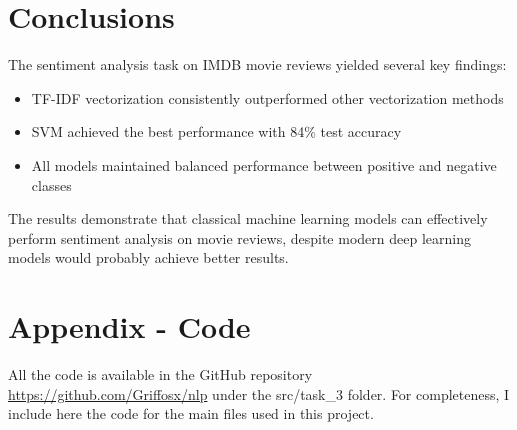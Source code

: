\documentclass[12pt]{article}
\begin{document}
\section{Conclusions}
The sentiment analysis task on IMDB movie reviews yielded several key findings:
\begin{itemize}
    \item TF-IDF vectorization consistently outperformed other vectorization methods
    \item SVM achieved the best performance with 84\% test accuracy
    \item All models maintained balanced performance between positive and negative classes
\end{itemize}

The results demonstrate that classical machine learning models can effectively perform sentiment analysis on movie reviews, despite modern deep learning models would probably achieve better results.

\newpage





\section{Appendix - Code}

All the code is available in the GitHub repository \url{https://github.com/Griffosx/nlp} under the src/task\_3 folder.
For completeness, I include here the code for the main files used in this project.
\end{document}
